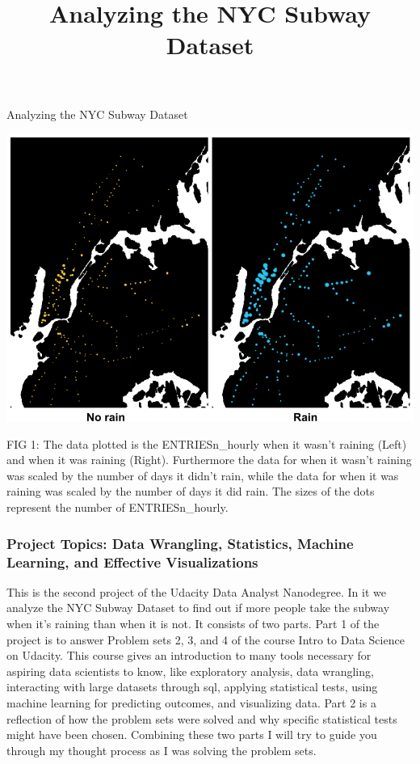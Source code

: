 \documentclass{article}
\title{Analyzing the NYC Subway Dataset}
\begin{document}
    \maketitle




    Analyzing the NYC Subway Dataset

\includegraphics{rain_no_rain_v2.png}

FIG 1: The data plotted is the ENTRIESn\_hourly when it wasn't raining
(Left) and when it was raining (Right). Furthermore the data for when it
wasn't raining was scaled by the number of days it didn't rain, while
the data for when it was raining was scaled by the number of days it did
rain. The sizes of the dots represent the number of ENTRIESn\_hourly.

\subsubsection{Project Topics: Data Wrangling, Statistics, Machine
Learning, and Effective
Visualizations}\label{project-topics-data-wrangling-statistics-machine-learning-and-effective-visualizations}

This is the second project of the Udacity Data Analyst Nanodegree. In it
we analyze the NYC Subway Dataset to find out if more people take the
subway when it's raining than when it is not. It consists of two parts.
Part 1 of the project is to answer Problem sets 2, 3, and 4 of the
course Intro to Data Science on Udacity. This course gives an
introduction to many tools necessary for aspiring data scientists to
know, like exploratory analysis, data wrangling, interacting with large
datasets through sql, applying statistical tests, using machine learning
for predicting outcomes, and visualizing data. Part 2 is a reflection of
how the problem sets were solved and why specific statistical tests
might have been chosen. Combining these two parts I will try to guide
you through my thought process as I was solving the problem sets.
\end{document}
